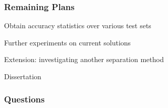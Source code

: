 \documentclass{beamer}
\begin{document}
\begin{frame}

\frametitle{Remaining Plans}

Obtain accuracy statistics over various test sets

\bigskip
\bigskip

Further experiments on current solutions

\bigskip
\bigskip

Extension: investigating another separation method

\bigskip
\bigskip

Dissertation

\end{frame}

\begin{frame}

\frametitle{Questions}

\end{frame}
\end{document}
